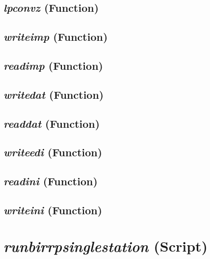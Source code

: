 \subsection{\textit{lpconvz} (Function)}
\label{ssec:processing.birrptools.lpconvz}

\subsection{\textit{writeimp} (Function)}
\label{ssec:processing.birrptools.writeimp}

\subsection{\textit{readimp} (Function)}
\label{ssec:processing.birrptools.readimp}

\subsection{\textit{writedat} (Function)}
\label{ssec:processing.birrptools.writedat}

\subsection{\textit{readdat} (Function)}
\label{ssec:processing.birrptools.readdat}

\subsection{\textit{writeedi} (Function)}
\label{ssec:processing.birrptools.writeedi}

\subsection{\textit{readini} (Function)}
\label{ssec:processing.birrptools.readini}

\subsection{\textit{writeini} (Function)}
\label{ssec:processing.birrptools.writeini}




\section{\textit{runbirrpsinglestation} (Script) }
\label{sec:processing.runbirrpsinglestation}

